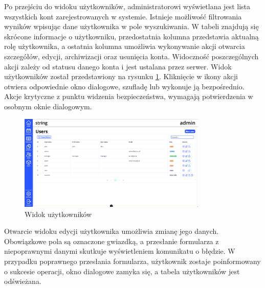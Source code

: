 Po przejściu do widoku użytkowników, administratorowi wyświetlana jest lista wszystkich kont zarejestrowanych w systemie. Istnieje możliwość filtrowania wyników wpisując dane użytkownika w pole wyszukiwania. W tabeli znajdują się skrócone informacje o użytkowniku, przedostatnia kolumna przedstawia aktualną rolę użytkownika, a ostatnia kolumna umożliwia wykonywanie akcji otwarcia szczegółów, edycji, archiwizacji oraz usunięcia konta. Widoczność poszczególnych akcji zależy od statusu danego konta i jest ustalana przez serwer. Widok użytkowników został przedstawiony na rysunku \ref{fig:usersView}. Kliknięcie w ikony akcji otwiera odpowiednie okno dialogowe, szufladę lub wykonuje ją bezpośrednio. Akcje krytyczne z punktu widzenia bezpieczeństwa, wymagają potwierdzenia w osobnym oknie dialogowym.

\begin{figure}[H]
    \centering
    \includegraphics[width=0.8\textwidth, frame]{graf/front/users.png}
    \caption{Widok użytkowników}
    \label{fig:usersView}
\end{figure}

Otwarcie widoku edycji użytkownika umożliwia zmianę jego danych. Obowiązkowe pola są oznaczone gwiazdką, a przesłanie formularza z niepoprawnymi danymi skutkuje wyświetleniem komunikatu o błędzie. W przypadku poprawnego przesłania formularza, użytkownik zostaje poinformowany o sukcesie operacji, okno dialogowe zamyka się, a tabela użytkowników jest odświeżana.

